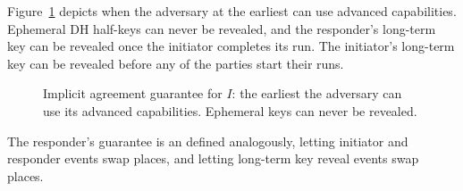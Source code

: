 %
Figure~\ref{fig:impAgreeI} depicts when the adversary at the earliest can use
advanced capabilities.
%
Ephemeral DH half-keys can never be revealed, and the responder's long-term key
can be revealed once the initiator completes its run.
%
The initiator's long-term key can be revealed before any of the parties start
their runs.
%
\begin{figure}[h!]
    \begin{center}
        \tikzset{>=latex}
        \caption{Implicit agreement guarantee for $I$: the earliest the
        adversary can use its advanced capabilities. Ephemeral keys can never be
        revealed.}
        \label{fig:impAgreeI}
    \end{center}
\end{figure}
%
The responder's guarantee is an defined analogously, letting initiator and
responder events swap places, and letting long-term key reveal events swap
places.\\
%

